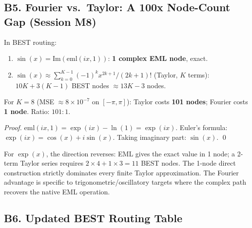 \subsection*{B5. Fourier vs.\ Taylor: A 100x Node-Count Gap (Session M8)}

\begin{proposition}
In BEST routing:
\begin{enumerate}
  \item $\sin(x) = \mathrm{Im}(\mathrm{eml}(ix, 1))$: \textbf{1 complex EML node},
    exact.
  \item $\sin(x) \approx \sum_{k=0}^{K-1} (-1)^k x^{2k+1}/(2k+1)!$
    (Taylor, $K$ terms): $10K + 3(K-1)$ BEST nodes $\approx 13K - 3$ nodes.
\end{enumerate}
For $K = 8$ (MSE $\approx 8 \times 10^{-7}$ on $[-\pi,\pi]$): Taylor costs
\textbf{101 nodes}; Fourier costs \textbf{1 node}. Ratio: $101:1$.
\end{proposition}

\begin{proof}
$\mathrm{eml}(ix, 1) = \exp(ix) - \ln(1) = \exp(ix)$. Euler's formula:
$\exp(ix) = \cos(x) + i\sin(x)$. Taking imaginary part: $\sin(x)$. \qed
\end{proof}

\begin{remark}
For $\exp(x)$, the direction reverses: EML gives the exact value in 1 node;
a 2-term Taylor series requires $2 \times 4 + 1 \times 3 = 11$ BEST nodes.
The 1-node direct construction strictly dominates every finite Taylor approximation.
The Fourier advantage is specific to trigonometric/oscillatory targets where
the complex path recovers the native EML operation.
\end{remark}

\subsection*{B6. Updated BEST Routing Table}

